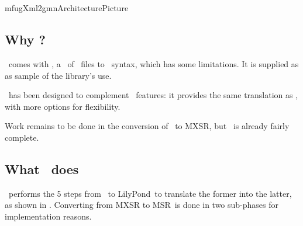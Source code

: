 



\chapter{\xmlToGmn\ }

{mfugXml2gmnArchitecturePicture}


\section{Why \xmlToGmn?}

\libmusicxml\ comes with \xmlToGuido, a \converter\ of \mxml\ files to \guido\ syntax, which has some limitations. It is supplied as as sample of the library's use.

\xmlToGmn\ has been designed to complement \libmusicxml\ features: it provides the same translation as \xmlToGuido, with more options for flexibility.

Work remains to be done in the conversion of \msrRepr\ to MXSR, but \xmlToGmn\ is already fairly complete.


\section{What \xmlToGmn\ does}

\xmlToGmn\ performs the 5 steps from \mxml\ to LilyPond\ to translate the former into the latter, as shown in . Converting from MXSR to MSR\ is done in two sub-phases for implementation reasons.

